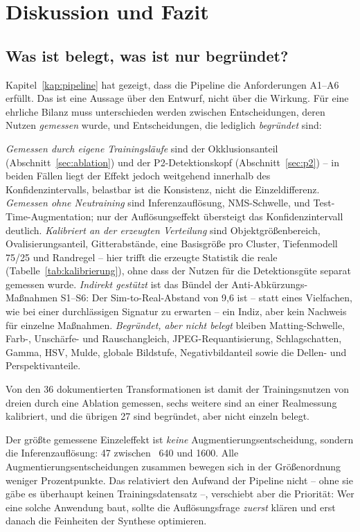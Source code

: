 \chapter{Diskussion und Fazit}
\label{kap:diskussion}

\section{Was ist belegt, was ist nur begründet?}
\label{sec:tragend}

Kapitel~\ref{kap:pipeline} hat gezeigt, dass die Pipeline die Anforderungen
A1--A6 erfüllt. Das ist eine Aussage über den Entwurf, nicht über die Wirkung.
Für eine ehrliche Bilanz muss unterschieden werden zwischen Entscheidungen, deren
Nutzen \emph{gemessen} wurde, und Entscheidungen, die lediglich \emph{begründet}
sind:

\emph{Gemessen durch eigene Trainingsläufe} sind der Okklusionsanteil
(Abschnitt~\ref{sec:ablation}) und der P2-Detektionskopf
(Abschnitt~\ref{sec:p2}) -- in beiden Fällen liegt der Effekt jedoch weitgehend
innerhalb des Konfidenzintervalls, belastbar ist die Konsistenz, nicht die
Einzeldifferenz. \emph{Gemessen ohne Neutraining} sind Inferenzauflösung,
NMS-Schwelle,  und Test-Time-Augmentation; nur der
Auflösungseffekt übersteigt das Konfidenzintervall deutlich. \emph{Kalibriert an
der erzeugten Verteilung} sind Objektgrößenbereich, Ovalisierungsanteil,
Gitterabstände, eine Basisgröße pro Cluster, Tiefenmodell 75/25 und Randregel --
hier trifft die erzeugte Statistik die reale (Tabelle~\ref{tab:kalibrierung}),
ohne dass der Nutzen für die Detektionsgüte separat gemessen wurde.
\emph{Indirekt gestützt} ist das Bündel der Anti-Abkürzungs-Maßnahmen S1--S6: Der
Sim-to-Real-Abstand von 9,6\PP{} ist -- statt eines Vielfachen, wie bei einer
durchlässigen Signatur zu erwarten -- ein Indiz, aber kein Nachweis für einzelne
Maßnahmen. \emph{Begründet, aber nicht belegt} bleiben Matting-Schwelle, Farb-,
Unschärfe- und Rauschangleich, JPEG-Requantisierung, Schlagschatten, Gamma, HSV,
Mulde, globale Bildstufe, Negativbildanteil sowie die Dellen- und
Perspektivanteile.

Von den 36 dokumentierten Transformationen ist damit der Trainingsnutzen von
dreien durch eine Ablation gemessen, sechs weitere sind an einer Realmessung
kalibriert, und die übrigen 27 sind begründet, aber nicht einzeln belegt.

 Der größte gemessene Einzeleffekt ist \emph{keine}
Augmentierungsentscheidung, sondern die Inferenzauflösung: 47\PP{} \mAPfifty{}
zwischen ~640 und 1600. Alle Augmentierungsentscheidungen zusammen
bewegen sich in der Größenordnung weniger Prozentpunkte. Das relativiert den
Aufwand der Pipeline nicht -- ohne sie gäbe es überhaupt keinen
Trainingsdatensatz --, verschiebt aber die Priorität: Wer eine solche Anwendung
baut, sollte die Auflösungsfrage \emph{zuerst} klären und erst danach die
Feinheiten der Synthese optimieren.

